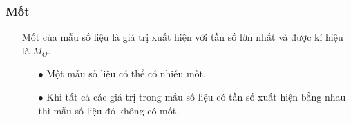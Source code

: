\subsubsection{Mốt}
\begin{itemize}
	\item [] Mốt của mẫu số liệu là giá trị xuất hiện với tần số lớn nhất và được kí hiệu là $M_O$.
	\item [] 
	\begin{boxdn}
	\begin{itemize}
		\item [$\bullet$] Một mẫu số liệu có thể có nhiều mốt.
		\item [$\bullet$] Khi tất cả các giá trị trong mấu số liệu có tần số xuất hiện bằng nhau thì mẫu số liệu đó không có mốt.
	\end{itemize}
	\end{boxdn}
\end{itemize}